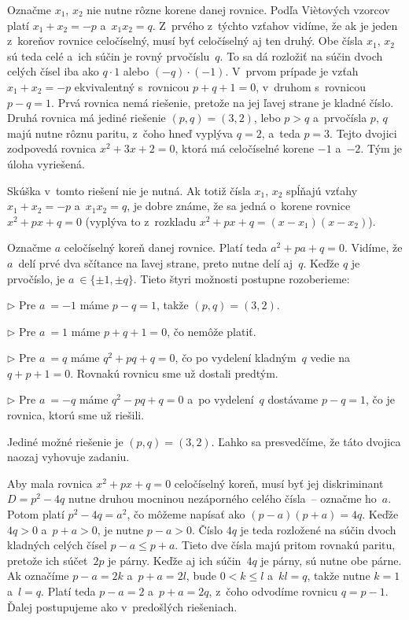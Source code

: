 {%
\def\*{\item{$\triangleright$}}
Označme $x_1$, $x_2$ nie nutne rôzne
korene danej rovnice. Podľa Vi\`etových vzorcov platí $x_1+x_2 ={-p}$
a~$x_1x_2 = q$. Z~prvého z~týchto vzťahov vidíme, že ak je jeden
z~koreňov rovnice celočíselný, musí byť celočíselný aj ten druhý.
Obe čísla $x_1$, $x_2$ sú teda celé a~ich súčin je rovný prvočíslu~$q$.
To sa dá rozložiť na súčin
dvoch celých čísel iba ako $q \cdot 1$ alebo $({-q}) \cdot ({-1})$.
V~prvom prípade je vzťah $x_1+x_2 ={-p}$ ekvivalentný s~rovnicou $p+q+1 = 0$,
v~druhom s~rovnicou $p-q = 1$. Prvá rovnica nemá riešenie, pretože na jej ľavej strane je
kladné číslo. Druhá rovnica má jediné riešenie $(p, q) = (3, 2)$,
lebo $p> q$ a~prvočísla $p$, $q$ majú nutne rôznu paritu, z~čoho hneď vyplýva
$q = 2$, a~teda $p = 3$. Tejto dvojici zodpovedá rovnica $x^2+3x+2 = 0$,
ktorá má celočíselné korene ${-1}$ a~${-2}$. Tým je úloha vyriešená.


\poznamka
Skúška v~tomto riešení nie je
nutná. Ak totiž čísla $x_1$, $x_2$ spĺňajú vzťahy $x_1+x_2 ={-p}$
a~$x_1x_2 = q$, je dobre známe, že sa jedná o~korene
rovnice $x^2+px+q = 0$ (vyplýva to z~rozkladu $x^2+px+q=(x-x_1)(x-x_2)$).

Označme $a$ celočíselný
koreň danej rovnice. Platí teda $a^2+pa+q = 0$. Vidíme, že $a$~delí
prvé dva sčítance na ľavej strane, preto nutne delí aj~$q$. Keďže
$q$ je prvočíslo, je $a~\in \{{\pm 1},\pm q\}$. Tieto štyri
možnosti postupne rozoberieme:

\* Pre $a~=-1$ máme $p-q = 1$, takže $(p, q) = (3, 2)$.
\* Pre $a~= 1$ máme $p+q+1 = 0$, čo nemôže platiť.
\* Pre $a~= q$ máme $q^2+pq+q = 0$, čo po vydelení kladným~$q$ vedie
na $q+p+1 = 0$. Rovnakú rovnicu sme už dostali predtým.
\* Pre $a~=-q$ máme $q^2-pq+q = 0$ a~po vydelení~$q$
dostávame $p-q = 1$, čo je rovnica, ktorú sme už riešili.

Jediné možné riešenie je $(p, q) = (3, 2)$. Ľahko sa presvedčíme,
že táto dvojica naozaj vyhovuje zadaniu.

Aby mala rovnica $x^2+px+q = 0$
celočíselný koreň, musí byť jej diskriminant $D = p^2-4q$ nutne
druhou mocninou nezáporného celého čísla~-- označme ho~$a$. Potom
platí $p^2-4q = a^2$, čo môžeme napísať ako $(p-a)(p+a) = 4q$.
Keďže $4q>0$ a~$p+a>0$, je nutne $p-a> 0$. Číslo $4q$ je teda
rozložené na súčin dvoch kladných celých čísel $p-a\le p+a$.
Tieto dve čísla majú pritom rovnakú paritu, pretože ich súčet~$2p$
je párny. Keďže aj ich súčin~$4q$ je párny,
sú nutne obe párne. Ak označíme $p-a= 2k$ a~$p+a= 2l$, bude
$0 <k\le l$ a~$kl = q$, takže nutne $k= 1$ a~$l = q$. Platí teda $p-a=2$
a~$p+a= 2q$, z~čoho odvodíme rovnicu $q = p-1$. Ďalej postupujeme ako
v~predošlých riešeniach.

}
